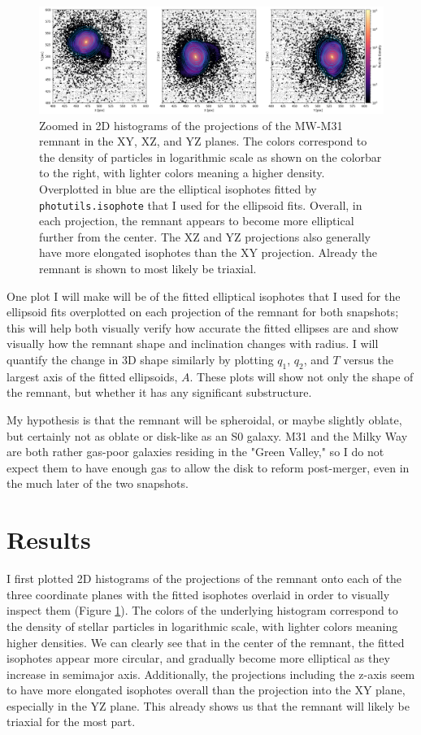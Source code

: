 \documentclass[twocolumn]{aastex631}
\begin{document}
\begin{figure}
    \centering
    \includegraphics[width=0.85\linewidth]{ellipse_fits.png}
    \caption{Zoomed in 2D histograms of the projections of the MW-M31 remnant in the XY, XZ, and YZ planes. The colors correspond to the density of particles in logarithmic scale as shown on the colorbar to the right, with lighter colors meaning a higher density. Overplotted in blue are the elliptical isophotes fitted by \texttt{photutils.isophote} that I used for the ellipsoid fits. Overall, in each projection, the remnant appears to become more elliptical further from the center. The XZ and YZ projections also generally have more elongated isophotes than the XY projection. Already the remnant is shown to most likely be triaxial.}
    \label{fig:ell_fits}
\end{figure}

One plot I will make will be of the fitted elliptical isophotes that I used for the ellipsoid fits overplotted on each projection of the remnant for both snapshots; this will help both visually verify how accurate the fitted ellipses are and show visually how the remnant shape and inclination changes with radius. 
I will quantify the change in 3D shape similarly by plotting $q_1$, $q_2$, and $T$ versus the largest axis of the fitted ellipsoids, $A$.
These plots will show not only the shape of the remnant, but whether it has any significant substructure.

My hypothesis is that the remnant will be spheroidal, or maybe slightly oblate, but certainly not as oblate or disk-like as an S0 galaxy. 
M31 and the Milky Way are both rather gas-poor galaxies residing in the "Green Valley," so I do not expect them to have enough gas to allow the disk to reform post-merger, even in the much later of the two snapshots.


\section{Results}

I first plotted 2D histograms of the projections of the remnant onto each of the three coordinate planes with the fitted isophotes overlaid in order to visually inspect them (Figure \ref{fig:ell_fits}). 
The colors of the underlying histogram correspond to the density of stellar particles in logarithmic scale, with lighter colors meaning higher densities.
We can clearly see that in the center of the remnant, the fitted isophotes appear more circular, and gradually become more elliptical as they increase in semimajor axis. 
Additionally, the projections including the z-axis seem to have more elongated isophotes overall than the projection into the XY plane, especially in the YZ plane.
This already shows us that the remnant will likely be triaxial for the most part.
\end{document}
